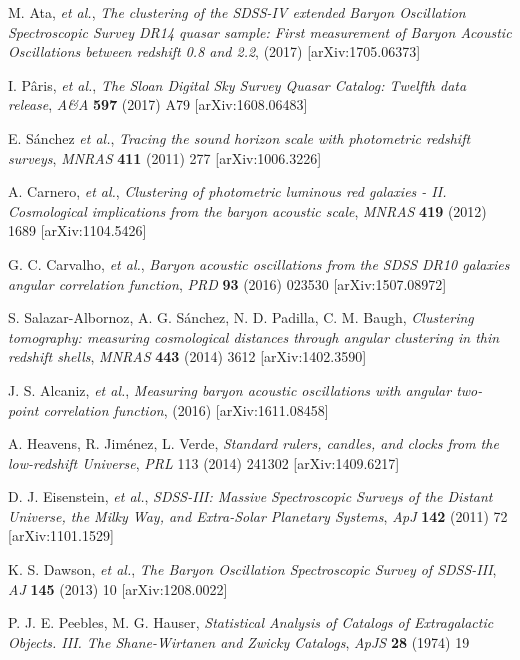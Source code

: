 \documentclass[a4paper,11pt]{article}
\begin{document}
\begin{thebibliography}{99}
M. Ata, {\it et al.},  
\emph{The clustering of the SDSS-IV extended Baryon Oscillation Spectroscopic Survey DR14 quasar 
sample: First measurement of Baryon Acoustic Oscillations between redshift 0.8 and 2.2},
(2017)
[arXiv:1705.06373]

I. P\^aris, {\it et al.}, 
\emph{The Sloan Digital Sky Survey Quasar Catalog: Twelfth data release}, 
\emph{A\&A} 
{\bf 597}
(2017)
A79
[arXiv:1608.06483]

E. S\'anchez {\it et al.}, 
\emph{Tracing the sound horizon scale with photometric redshift surveys}, 
\emph{MNRAS} 
{\bf 411} 
(2011)
277 
[arXiv:1006.3226]

A. Carnero, {\it et al.}, 
\emph{Clustering of photometric luminous red galaxies - II. 
Cosmological implications from the baryon acoustic scale}, 
\emph{MNRAS} 
{\bf 419} 
(2012)
1689
[arXiv:1104.5426]

G. C. Carvalho, {\it et al.},  
\emph{Baryon acoustic oscillations from the SDSS DR10 galaxies angular correlation function}, 
\emph{PRD} 
{\bf 93} 
(2016) 
023530
[arXiv:1507.08972]

S. Salazar-Albornoz, A. G. S\'anchez, N. D. Padilla, C. M. Baugh, 
\emph{Clustering tomography: measuring cosmological distances through angular clustering in thin 
redshift shells}, 
\emph{MNRAS}
{\bf 443} 
(2014) 
3612
[arXiv:1402.3590]

J. S. Alcaniz, {\it et al.},  
\emph{Measuring baryon acoustic oscillations with angular two-point correlation function}, 
(2016) 
[arXiv:1611.08458]

A. Heavens, R. Jim\'enez, L. Verde, 
\emph{Standard rulers, candles, and clocks from the low-redshift Universe}, 
\emph{PRL}
113 
(2014)
241302
[arXiv:1409.6217]

D. J. Eisenstein, {\it et al.}, 
\emph{SDSS-III: Massive Spectroscopic Surveys of the Distant Universe, the Milky Way, 
and Extra-Solar Planetary Systems}, 
\emph{ApJ} 
{\bf 142} 
(2011) 
72
[arXiv:1101.1529]

K. S. Dawson, {\it et al.}, 
\emph{The Baryon Oscillation Spectroscopic Survey of SDSS-III}, 
\emph{AJ} 
{\bf 145}
(2013)
10 
[arXiv:1208.0022]

P. J. E. Peebles, M. G. Hauser, 
\emph{Statistical Analysis of Catalogs of Extragalactic Objects. III. 
The Shane-Wirtanen and Zwicky Catalogs}, 
\emph{ApJS}
{\bf 28}
(1974)
19 


\end{thebibliography}
\end{document}

